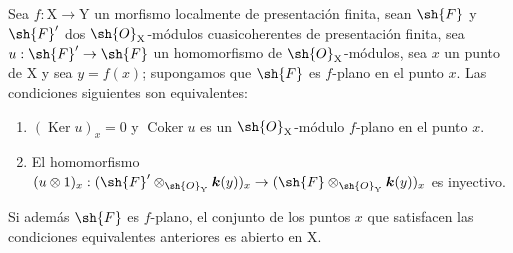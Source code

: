 \begin{proposition}[11.3.7]
\label{IV.11.3.7}
Sea $f:\mathrm{X}\to\mathrm{Y}$ un morfismo localmente de presentación finita, sean $\sh{F}$ y $\sh{F}'$ dos $\sh{O}_\mathrm{X}$-módulos cuasicoherentes de presentación finita, sea $u:\sh{F}'\to\sh{F}$ un homomorfismo de $\sh{O}_\mathrm{X}$-módulos, sea $x$ un punto de $\mathrm{X}$ y sea $y=f(x)$; supongamos que $\sh{F}$ es $f$-plano en el punto $x$. Las condiciones siguientes son equivalentes:
\begin{enumerate}[label=\emph{\alph*)}]
  \item $(\operatorname{Ker} u)_x=0$ y $\operatorname{Coker} u$ es un $\sh{O}_\mathrm{X}$-módulo $f$-plano en el punto $x$.
  \item El homomorfismo $(u\otimes 1)_x:(\sh{F}'\otimes_{\sh{O}_\mathrm{Y}}\boldsymbol{k}(y))_x\to(\sh{F}\otimes_{\sh{O}_\mathrm{Y}}\boldsymbol{k}(y))_x$ es inyectivo.
\end{enumerate}
Si además $\sh{F}$ es $f$-plano, el conjunto de los puntos $x$ que satisfacen las condiciones equivalentes anteriores es abierto en $\mathrm{X}$.
\end{proposition}

